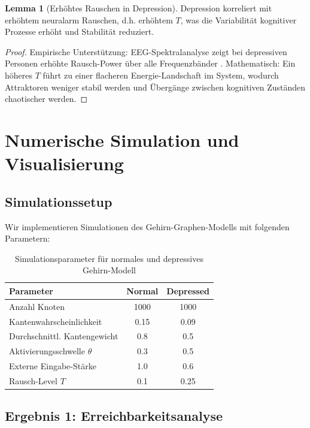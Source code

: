 \documentclass[a4paper,12pt]{article}
\theoremstyle{definition}
\newtheorem{lemma}{Lemma}
\begin{document}
\begin{lemma}[Erhöhtes Rauschen in Depression]
Depression korreliert mit erhöhtem neuralarm Rauschen, d.h. erhöhtem $T$, was die Variabilität kognitiver Prozesse erhöht und Stabilität reduziert.
\end{lemma}

\begin{proof}
Empirische Unterstützung: EEG-Spektralanalyse zeigt bei depressiven Personen erhöhte Rausch-Power über alle Frequenzbänder \cite{olbrich2009}. Mathematisch: Ein höheres $T$ führt zu einer flacheren Energie-Landschaft im System, wodurch Attraktoren weniger stabil werden und Übergänge zwischen kognitiven Zuständen chaotischer werden.
\end{proof}

\section{Numerische Simulation und Visualisierung}

\subsection{Simulationssetup}

Wir implementieren Simulationen des Gehirn-Graphen-Modells mit folgenden Parametern:

\begin{table}[h]
\centering
\begin{tabular}{lcc}
\toprule
\textbf{Parameter} & \textbf{Normal} & \textbf{Depressed} \\
\midrule
Anzahl Knoten & 1000 & 1000 \\
Kantenwahrscheinlichkeit & 0.15 & 0.09 \\
Durchschnittl. Kantengewicht & 0.8 & 0.5 \\
Aktivierungsschwelle $\theta$ & 0.3 & 0.5 \\
Externe Eingabe-Stärke & 1.0 & 0.6 \\
Rausch-Level $T$ & 0.1 & 0.25 \\
\bottomrule
\end{tabular}
\caption{Simulationsparameter für normales und depressives Gehirn-Modell}
\label{tab:params}
\end{table}

\subsection{Ergebnis 1: Erreichbarkeitsanalyse}
\end{document}
